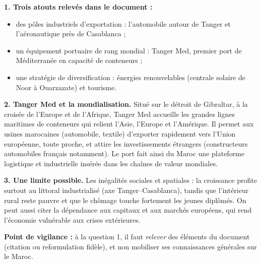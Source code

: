 \documentclass[11pt]{article}
\begin{document}
\begin{corrige}
\textbf{1. Trois atouts relevés dans le document :}
\begin{itemize}
\item des pôles industriels d'exportation : l'automobile autour de Tanger et l'aéronautique près de Casablanca ;
\item un équipement portuaire de rang mondial : Tanger Med, premier port de Méditerranée en capacité de conteneurs ;
\item une stratégie de diversification : énergies renouvelables (centrale solaire de Noor à Ouarzazate) et tourisme.
\end{itemize}

\textbf{2. Tanger Med et la mondialisation.} Situé sur le détroit de Gibraltar, à la croisée de l'Europe et de l'Afrique, Tanger Med accueille les grandes lignes maritimes de conteneurs qui relient l'Asie, l'Europe et l'Amérique. Il permet aux usines marocaines (automobile, textile) d'exporter rapidement vers l'Union européenne, toute proche, et attire les investissements étrangers (constructeurs automobiles français notamment). Le port fait ainsi du Maroc une plateforme logistique et industrielle insérée dans les chaînes de valeur mondiales.

\textbf{3. Une limite possible.} Les inégalités sociales et spatiales : la croissance profite surtout au littoral industrialisé (axe Tanger--Casablanca), tandis que l'intérieur rural reste pauvre et que le chômage touche fortement les jeunes diplômés. On peut aussi citer la dépendance aux capitaux et aux marchés européens, qui rend l'économie vulnérable aux crises extérieures.

\textbf{Point de vigilance :} à la question 1, il faut \emph{relever} des éléments du document (citation ou reformulation fidèle), et non mobiliser ses connaissances générales sur le Maroc.
\end{corrige}
\end{document}
